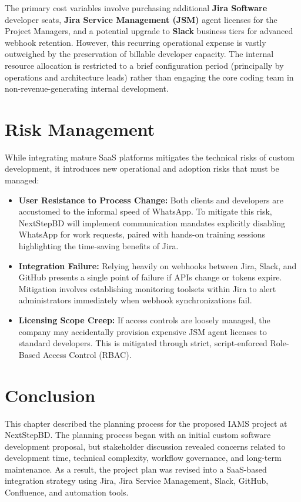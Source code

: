 \documentclass[12pt,a4paper]{report}
\begin{document}
The primary cost variables involve purchasing additional \textbf{Jira Software} developer seats, \textbf{Jira Service Management (JSM)} agent licenses for the Project Managers, and a potential upgrade to \textbf{Slack} business tiers for advanced webhook retention. However, this recurring operational expense is vastly outweighed by the preservation of billable developer capacity. The internal resource allocation is restricted to a brief configuration period (principally by operations and architecture leads) rather than engaging the core coding team in non-revenue-generating internal development.

\section{Risk Management}

While integrating mature SaaS platforms mitigates the technical risks of custom development, it introduces new operational and adoption risks that must be managed:

\begin{itemize}[leftmargin=*]
    \item \textbf{User Resistance to Process Change:} Both clients and developers are accustomed to the informal speed of WhatsApp. To mitigate this risk, NextStepBD will implement communication mandates explicitly disabling WhatsApp for work requests, paired with hands-on training sessions highlighting the time-saving benefits of Jira.
    \item \textbf{Integration Failure:} Relying heavily on webhooks between Jira, Slack, and GitHub presents a single point of failure if APIs change or tokens expire. Mitigation involves establishing monitoring toolsets within Jira to alert administrators immediately when webhook synchronizations fail.
    \item \textbf{Licensing Scope Creep:} If access controls are loosely managed, the company may accidentally provision expensive JSM agent licenses to standard developers. This is mitigated through strict, script-enforced Role-Based Access Control (RBAC).
\end{itemize}

\section{Conclusion}

This chapter described the planning process for the proposed IAMS project at NextStepBD. The planning process began with an initial custom software development proposal, but stakeholder discussion revealed concerns related to development time, technical complexity, workflow governance, and long-term maintenance. As a result, the project plan was revised into a SaaS-based integration strategy using Jira, Jira Service Management, Slack, GitHub, Confluence, and automation tools.
\end{document}
